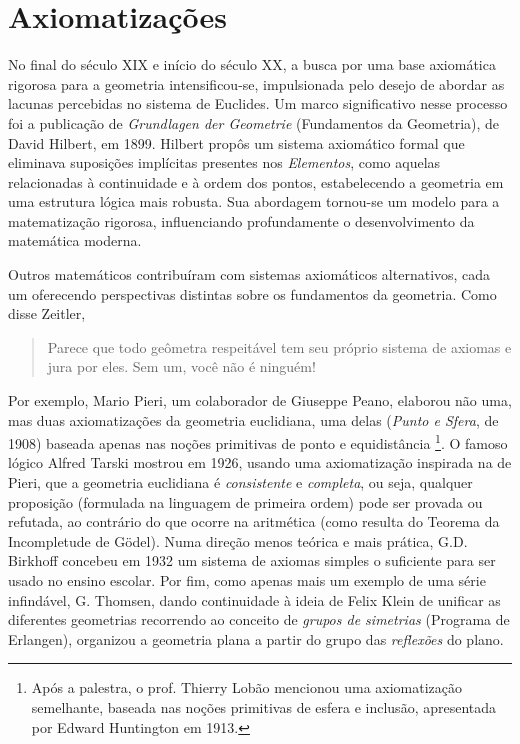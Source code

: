 \documentclass{hipatia}
\begin{document}

\section{Axiomatizações}

No final do século XIX e início do século XX, a busca por
uma base axiomática rigorosa para a geometria
intensificou-se, impulsionada pelo desejo de abordar as
lacunas percebidas no sistema de Euclides. Um marco
significativo nesse processo foi a publicação de \emph{Grundlagen
der Geometrie} (Fundamentos da Geometria), de David Hilbert,
em 1899. Hilbert propôs um sistema axiomático formal que
eliminava suposições implícitas presentes nos \emph{Elementos},
como aquelas relacionadas à continuidade e à ordem dos
pontos, estabelecendo a geometria em uma estrutura lógica
mais robusta. Sua abordagem tornou-se um modelo para a
matematização rigorosa, influenciando profundamente o
desenvolvimento da matemática moderna.

Outros matemáticos
contribuíram com sistemas axiomáticos alternativos, cada um
oferecendo perspectivas distintas sobre os fundamentos da
geometria. Como disse Zeitler,
\begin{quote}
	Parece que todo geômetra respeitável tem seu próprio
sistema de axiomas e jura por eles. Sem um, você não
é ninguém! \cite{zeitler1990}
\end{quote}
Por exemplo, Mario Pieri, um colaborador de 
Giuseppe Peano, elaborou não uma, mas duas 
axiomatizações da geometria euclidiana, uma delas 
(\emph{Punto e Sfera}, de 1908) baseada apenas 
nas noções primitivas de ponto e 
equidistância \footnote{Após a 
palestra, o prof. Thierry Lobão  mencionou 
uma axiomatização semelhante, baseada 
nas noções primitivas de esfera e inclusão,
apresentada por Edward Huntington em 1913.}.
O famoso lógico Alfred Tarski mostrou em 1926, 
usando uma axiomatização inspirada na de Pieri,
que a geometria euclidiana é \emph{consistente} e 
\emph{completa},
ou seja, qualquer proposição (formulada na linguagem
de primeira ordem) pode ser provada ou refutada,
ao contrário do que ocorre na aritmética (como resulta 
do Teorema da Incompletude de Gödel).
Numa direção menos teórica e mais prática,
G.D. Birkhoff concebeu em  1932 um sistema de axiomas 
simples o suficiente para ser usado no ensino
escolar. Por fim, como apenas mais um exemplo
de uma série infindável, G. Thomsen, dando 
continuidade à ideia de Felix Klein de 
unificar as diferentes geometrias recorrendo
ao conceito de \emph{grupos de simetrias}
(Programa de Erlangen), organizou a geometria 
plana a partir do grupo das \emph{reflexões}
do plano.
\end{document}
